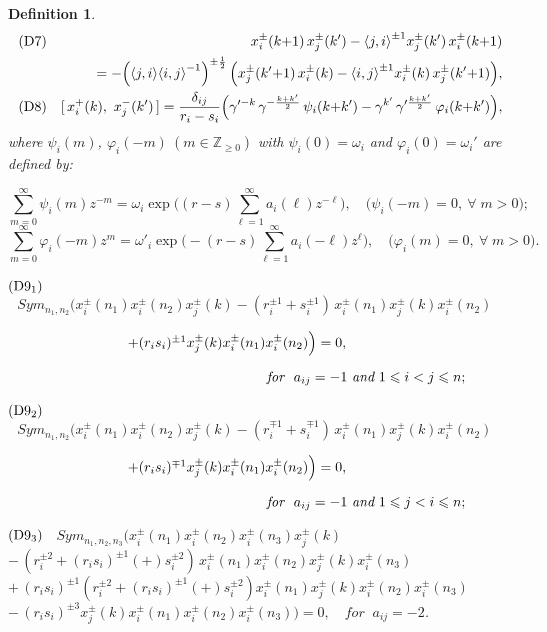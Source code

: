 \documentclass{amsproc}
\newtheorem{defi}[theo]{Definition}
\theoremstyle{remark}
\numberwithin{equation}{section}
\begin{document}
\begin{defi}
\begin{eqnarray*}
({\rm D7})&&x_i^{\pm}(k{+}1)\,x_j^{\pm}(k') - {\langle} j,i{\rangle}^{\pm1} x_j^{\pm}(k')\,x_i^{\pm}(k{+}1)\\
&&=-\Bigl({\langle} j,i{\rangle}{\langle}
i,j{\rangle}^{-1}\Bigr)^{\pm\frac1{2}}\,\Bigl(x_j^{\pm}(k'{+}1)\,x_i^{\pm}(k)-{\langle}
i,j{\rangle}^{\pm1} x_i^{\pm}(k)\,x_j^{\pm}(k'{+}1)\Bigr),\\
({\rm
D8})&&[\,x_i^{+}(k),~x_j^-(k')\,]=\frac{\delta_{ij}}{r_i-s_i}\Big(\gamma'^{-k}\,{\gamma}^{-\frac{k+k'}{2}}\,
\psi_i(k{+}k')-\gamma^{k'}\,\gamma'^{\frac{k+k'}{2}}\,\varphi_i(k{+}k')\Big),
\end{eqnarray*}
where
$\psi_i(m)$, $\varphi_i(-m)~(m\in \mathbb{Z}_{\geq 0})$ with
$\psi_i(0)={\omega}_i$ and $\varphi_i(0)={\omega}_i'$ are defined by:

$$\sum\limits_{m=0}^{\infty}\psi_i(m) z^{-m}={\omega}_i \exp \Big(
(r{-}s)\sum\limits_{\ell=1}^{\infty}
 a_i(\ell)z^{-\ell}\Big),\quad \bigl(\psi_i(-m)=0, \ \forall\;m>0\bigr);
$$
$$\sum\limits_{m=0}^{\infty}\varphi_i(-m) z^{m}={\omega}'_i \exp
\Big({-}(r{-}s)
\sum\limits_{\ell=1}^{\infty}a_i(-\ell)z^{\ell}\Big), \quad
\bigl(\varphi_i(m)=0, \ \forall\;m>0\bigr).
$$

\medskip
\noindent$({\rm D9_1})$ \ $~~~Sym_{n_1, n_2}\Big(x_i^{\pm}(n_1)
x_i^{\pm}(n_2)x_j^{\pm}(k)-(r_i^{\pm1}{+}s_i^{\pm1})\,x_i^{\pm}(n_1)x_j^{\pm}(k)x_i^{\pm}(n_2)$

$\hskip3cm +(r_is_i)^{\pm1}
x_j^{\pm}(k)x_i^{\pm}(n_1)x_i^{\pm}(n_2)\Big)=0, $

$\hskip 6.5cm  \textit{for }
\ a_{ij}=-1 \ \textit{and}\  1\leqslant i < j \leqslant n;$

\medskip
\noindent $({\rm D9_2})$ \ $~~~Sym_{n_1, n_2}\Big(x_i^{\pm}(n_1)
x_i^{\pm}(n_2)x_j^{\pm}(k)-(r_i^{\mp1}{+}s_i^{\mp1})\,x_i^{\pm}(n_1)x_j^{\pm}(k)x_i^{\pm}(n_2)$

$\hskip3cm +(r_is_i)^{\mp1}
x_j^{\pm}(k)x_i^{\pm}(n_1)x_i^{\pm}(n_2)\Big)=0, $

$\hskip 6.5cm  \textit{for }
\ a_{ij}=-1\  \textit{and}\  1\leqslant j < i \leqslant n;$

\medskip
\noindent $({\rm D9_3})$ \ $Sym_{n_1,
n_2,n_3}\Big(x_i^{\pm}(n_1)
x_i^{\pm}(n_2)x_i^{\pm}(n_3)x_j^{\pm}(k)
$\\

$-\,
(r_i^{\pm2}{+}(r_is_i)^{\pm1}(+)s_i^{\pm2})\,x_i^{\pm}(n_1)x_i^{\pm}(n_2)x_j^{\pm}(k)x_i^{\pm}(n_3)
$\\

$+\,(r_is_i)^{\pm1}(r_i^{\pm2}{+}(r_is_i)^{\pm1}(+)s_i^{\pm2})
x_i^{\pm}(n_1)x_j^{\pm}(k)x_i^{\pm}(n_2)x_i^{\pm}(n_3)
$\\

$-\,(r_is_i)^{\pm3}x_j^{\pm}(k)x_i^{\pm}(n_1)x_i^{\pm}(n_2)x_i^{\pm}(n_3)\Big)=0,
\quad \textit{for } \ a_{ij}=-2$.
\end{defi}
\end{document}
